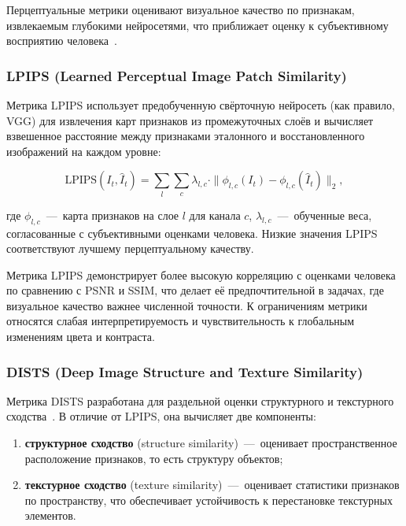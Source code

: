 Перцептуальные метрики оценивают визуальное качество по признакам, извлекаемым глубокими нейросетями, что приближает оценку к субъективному восприятию человека~\cite{kye2026acevfi}.

\subsubsection*{LPIPS (Learned Perceptual Image Patch Similarity)}

Метрика LPIPS использует предобученную свёрточную нейросеть (как правило, VGG) для извлечения карт признаков из промежуточных слоёв и вычисляет взвешенное расстояние между признаками эталонного и восстановленного изображений на каждом уровне:

\begin{equation}
	\text{LPIPS}(I_t, \hat{I}_t) = \sum_{l} \sum_{c} \lambda_{l,c} \cdot \| \phi_{l,c}(I_t) - \phi_{l,c}(\hat{I}_t) \|_2,
\end{equation}

где $\phi_{l,c}$~---~карта признаков на слое $l$ для канала $c$, $\lambda_{l,c}$~---~обученные веса, согласованные с субъективными оценками человека. Низкие значения LPIPS соответствуют лучшему перцептуальному качеству.

Метрика LPIPS демонстрирует более высокую корреляцию с оценками человека по сравнению с PSNR и SSIM, что делает её предпочтительной в задачах, где визуальное качество важнее численной точности. К ограничениям метрики относятся слабая интерпретируемость и чувствительность к глобальным изменениям цвета и контраста.

\subsubsection*{DISTS (Deep Image Structure and Texture Similarity)}

Метрика DISTS разработана для раздельной оценки структурного и текстурного сходства~\cite{ding2020}. В отличие от LPIPS, она вычисляет две компоненты:

\begin{enumerate}
	\item \textbf{структурное сходство} (structure similarity)~---~оценивает пространственное расположение признаков, то есть структуру объектов;
	\item \textbf{текстурное сходство} (texture similarity)~---~оценивает статистики признаков по пространству, что обеспечивает устойчивость к перестановке текстурных элементов.
\end{enumerate}

